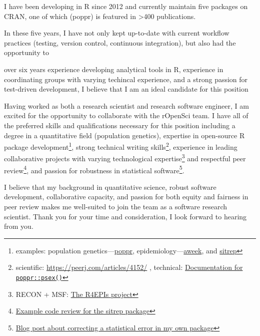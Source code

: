  
I have been developing in R since 2012 and currently maintain five packages on
CRAN, one of which (poppr) is featured in \textgreater400 publications.  

In these five
years, I have not only kept up-to-date with current workflow practices (testing,
version control, continuous integration), but also had the opportunity to 

 over six years experience developing analytical tools in R, experience in coordinating groups with varying
techincal experience, and a strong passion for test-driven development, I
believe that I am an ideal candidate for this position

Having worked as both a research scientist and research software engineer, I am
excited for the opportunity to collaborate with the rOpenSci team. I have all
of the preferred skills and qualifications necessary for this position
including a degree in a quantitative field (population genetics), expertise in
open-source R package development\footnote{examples: population genetics---\href{https://grunwaldlab.github.io/poppr}{poppr}, epidemiology---\href{https://www.repidemicsconsortium.org/aweek}{aweek}, and
\href{https://github.com/R4EPI/sitrep}{sitrep}}, strong technical writing
skills\footnote{scientific: \url{https://peerj.com/articles/4152/} , technical:
\href{https://grunwaldlab.github.io/poppr/reference/psex.html}{Documentation
for \texttt{poppr::psex()}}}, experience in leading collaborative
projects with varying technological expertise\footnote{RECON + MSF: \href{https://R4EPIs.netlify.com}{The R4EPIs
project}} and respectful peer
review\footnote{\href{https://github.com/R4EPI/sitrep/pull/76}{Example code
review for the sitrep package}}, and passion for robustness in statistical
software\footnote{\href{https://zkamvar.netlify.com/post/2017-09-23-squish/squish}{Blog
post about correcting a statistical error in my own package}}.

I believe that my background in quantitative science, robust software
development, collaborative capacity, and passion for both equity and 
fairness in peer review makes me well-suited to join the team as a software
research scientist. Thank you for your time and consideration,
I look forward to hearing from you. 

\makeletterclosing %

\clearpage



